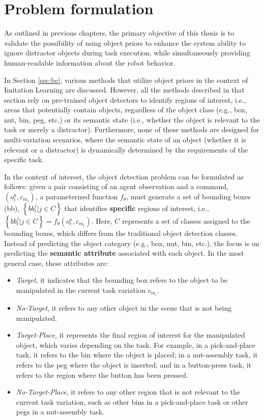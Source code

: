 \section{Problem formulation}
\label{sec:cod_problem}
As outlined in previous chapters, the primary objective of this thesis is to validate the possibility of using object priors to enhance the system ability to ignore distractor objects during task execution, while simultaneously providing human-readable information about the robot behavior.

In Section \ref{sec:bc}, various methods that utilize object priors in the context of Imitation Learning are discussed. However, all the methods described in that section rely on pre-trained object detectors to identify regions of interest, i.e., areas that potentially contain objects, regardless of the object class (e.g., box, nut, bin, peg, etc.) or its semantic state (i.e., whether the object is relevant to the task or merely a distractor). Furthermore, none of these methods are designed for multi-variation scenarios, where the semantic state of an object (whether it is relevant or a distractor) is dynamically determined by the requirements of the specific task.

In the context of interest, the object detection problem can be formulated as follows: given a pair consisting of an agent observation and a command, $\left( o_{t}^{a}, c_{m_{i}} \right)$,  a parameterized function $f_{\theta}$, must generate a set of bounding boxes (bb), $\left\{ bb^{j}_{t} | j \in C \right\}$ that identifies \textbf{specific} regions of interest, i.e., $\left\{ bb^{j}_{t} | j \in C \right\} = f_{\theta}(o_{t}^{a}, c_{m_{i}})$. Here, $C$ represents a set of classes assigned to the bounding boxes, which differs from the traditional object detection classes. Instead of predicting the object category (e.g., box, nut, bin, etc.), the focus is on predicting the \textbf{semantic attribute} associated with each object. In the most general case, these attributes are:

\begin{itemize} 
    \item \textit{Target}, it indicates that the bounding box refers to the object to be manipulated in the current task variation $c_{m_{i}}$. 
    \item \textit{No-Target}, it refers to any other object in the scene that is not being manipulated. 
    \item \textit{Target-Place}, it represents the final region of interest for the manipulated object, which varies depending on the task. For example, in a pick-and-place task, it refers to the bin where the object is placed; in a nut-assembly task, it refers to the peg where the object is inserted; and in a button-press task, it refers to the region where the button has been pressed. 
    \item \textit{No-Target-Place}, it refers to any other region that is not relevant to the current task variation, such as other bins in a pick-and-place task or other pegs in a nut-assembly task. 
\end{itemize}

